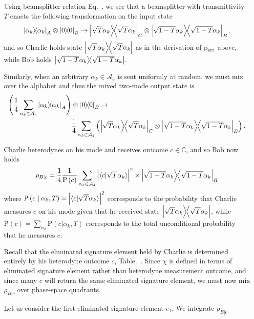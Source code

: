 Using beamsplitter relation Eq.~, we see that a beamsplitter with transmittivity $T$ enacts the following transformation on the input state
\begin{equation}
\dyad{\alpha_k}_A \otimes \dyad{0}_B \rightarrow \dyad{\sqrt{T} \alpha_k}_C \otimes \dyad{\sqrt{1-T}\alpha_k}_{B},
\end{equation}
and so Charlie holds state $\dyad{\sqrt{T}\alpha_k}$ as in the derivation of $\text{p}_{\text{err}}$ above, while Bob holds $\dyad{\sqrt{1-T}\alpha_k}$.

Similarly, when an arbitrary $\alpha_k \in \mathcal{A}_4$ is sent uniformly at random, we must mix over the alphabet and thus the mixed two-mode output state is
\begin{align}
\left(\frac{1}{4}\sum_{\alpha_k \in \mathcal{A}_4} \dyad{\alpha_k}_A\right) &\otimes \dyad{0}_B \rightarrow \notag \\
&\frac{1}{4}\sum_{\alpha_k \in \mathcal{A}_4} \left(\dyad{\sqrt{T}\alpha_k}_C \otimes \dyad{\sqrt{1-T}\alpha_k}_B\right).
\end{align}

\noindent Charlie heterodynes on his mode and receives outcome $c \in \mathbb{C}$, and so Bob now holds
\begin{equation}
\rho_{B | c} = \frac{1}{4}\frac{1}{\text{P}\left(c\right)}\sum_{\alpha_k \in \mathcal{A}_4} \left| \langle c | \sqrt{T}\alpha_k\rangle \right|^2 \times \dyad{\sqrt{1-T}\alpha_k}_B
\end{equation}
where $\text{P}\left(c \; \middle| \; \alpha_k, T\right) = \left| \langle c | \sqrt{T}\alpha_k\rangle \right|^2$ corresponds to the probability that Charlie measures $c$ on his mode given that he received state $\dyad{\sqrt{T}\alpha_k}$, while $\text{P}\left(c\right) = \sum_{\alpha_k} \text{P}\left(c | \alpha_k, T\right)$ corresponds to the total unconditional probability that he measures $c$.

Recall that the eliminated signature element held by Charlie is determined entirely by his heterodyne outcome $c$, Table.~. Since $\chi$ is defined in terms of eliminated signature element rather than heterodyne measurement outcome, and since many $c$ will return the same eliminated signature element, we must now mix $\rho_{B | c}$ over phase-space quadrants.


Let us consider the first eliminated signature element $e_1$. We integrate $\rho_{B | c}$

